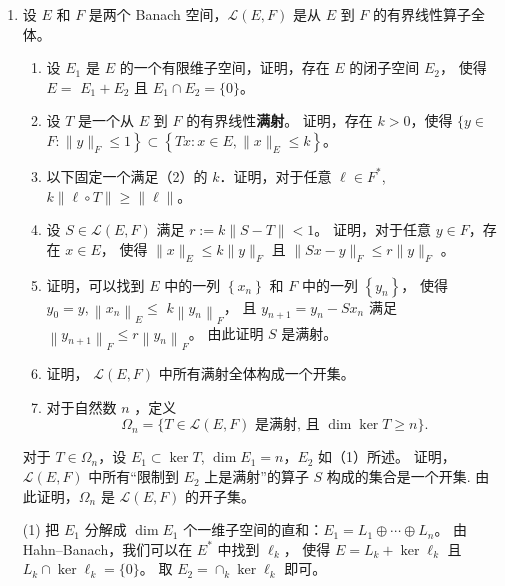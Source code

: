 \begin{enumerate}
\begin{proofc}
\begin{itemize}
\item 由 Hölder 不等式可知，从 $L^{q}$ 到 $L^{p}$ 的恒等映射是连续的，
且映射的像为 $\bigcup_{n}\left\{f,\|f\|_{L^{q}} \leqslant n\right\}$。
这样如果映射的像不是第一纲的，那么由开映照定理的证明可知像集应为全空间，矛盾。\qedhere
\end{itemize}
\end{proofc}
\item 设 $E$ 和 $F$ 是两个 Banach 空间，$\mathcal{L}(E, F)$ 是从 $E$ 到 $F$ 的有界线性算子全体。
\begin{enumerate}[label=(\arabic*)]
\item 设 $E_{1}$ 是 $E$ 的一个有限维子空间，证明，存在 $E$ 的闭子空间 $E_{2}$，
使得 $E=$ $E_{1}+E_{2}$ 且 $E_{1} \cap E_{2}=\{0\}$。
\item 设 $T$ 是一个从 $E$ 到 $F$ 的有界线性\textbf{满射}。
证明，存在 $k>0$，使得 $\{y \in$ $\left.F:\|y\|_{F} \leqslant 1\right\} \subset\left\{T x: x \in E,\|x\|_{E} \leqslant k\right\}$。
\item 以下固定一个满足（2）的 $k$．证明，对于任意 $\ell \in F^{*}$, $k\|\ell \circ T\| \geqslant\|\ell\|$。
\item 设 $S \in \mathcal{L}(E, F)$ 满足 $r:=k\|S-T\|<1$。
证明，对于任意 $y \in F$，存在 $x \in E$，
使得 $\|x\|_{E} \leqslant k\|y\|_{F}$ 且 $\|S x-y\|_{F} \leqslant r\|y\|_{F}$ 。
\item 证明，可以找到 $E$ 中的一列 $\left\{x_{n}\right\}$ 
和 $F$ 中的一列 $\left\{y_{n}\right\}$，
使得 $y_{0}=y,\left\|x_{n}\right\|_{E} \leqslant$ $k\left\|y_{n}\right\|_{F}$，
且 $y_{n+1}=y_{n}-S x_{n}$ 满足 $\left\|y_{n+1}\right\|_{F} \leqslant r\left\|y_{n}\right\|_{F}$。
由此证明 $S$ 是满射。
\item 证明， $\mathcal{L}(E, F)$ 中所有满射全体构成一个开集。
\item 对于自然数 $n$ ，定义
$$\Omega_{n}=\{T \in \mathcal{L}(E, F) \text { 是满射, 且 } \dim \ker T \geqslant n\}.$$
\end{enumerate}
对于 $T \in \Omega_{n}$，设 $E_{1} \subset \ker T$, $\dim E_{1}=n$，$E_{2}$ 如（1）所述。
证明， $\mathcal{L}(E, F)$ 中所有``限制到 $E_{2}$ 上是满射''的算子 $S$ 构成的集合是一个开集.
由此证明，$\Omega_{n}$ 是 $\mathcal{L}(E, F)$ 的开子集。
\begin{proofc}
(1) 把 $E_{1}$ 分解成 $\operatorname{dim} E_{1}$ 个一维子空间的直和：$E_{1}=L_{1} \oplus \cdots \oplus L_{n}$。
由 Hahn--Banach，我们可以在 $E^{*}$ 中找到 $\ell_{k}$，
使得 $E=L_{k}+\ker \ell_{k}$ 且 $L_{k} \cap \ker\ell_{k}=\{0\}$。
取 $E_{2}=\cap_{k} \operatorname{ker} \ell_{k}$ 即可。


\end{proofc}
\end{enumerate}
